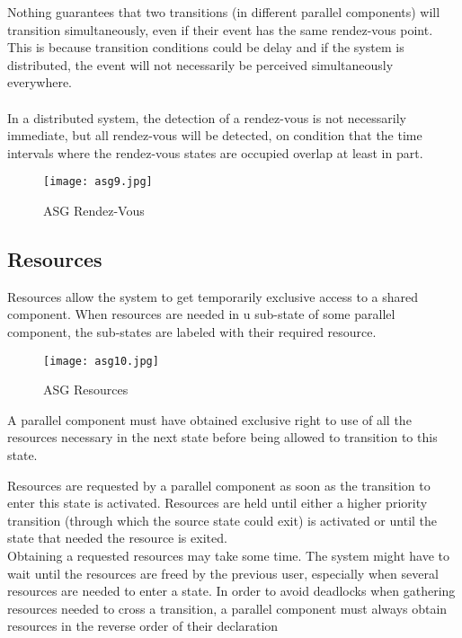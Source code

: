 \documentclass[../main.tex]{subfiles}
\begin{document}
Nothing guarantees that two transitions (in different parallel components) will transition simultaneously, even if their event has the same rendez-vous point. This is because transition conditions could be delay and if the system is distributed, the event will not necessarily be perceived simultaneously everywhere.
\\\\
In a distributed system, the detection of a rendez-vous is not necessarily immediate, but all rendez-vous will be detected, on condition that the time intervals where the rendez-vous states are occupied overlap at least in part. 
\begin{figure}[H]
    \centering
    \texttt{[image: asg9.jpg]}
    \caption{ASG Rendez-Vous}
    \label{asg9}
\end{figure}

\subsection{Resources}
Resources allow the system to get temporarily exclusive access to a shared component. When resources are needed in u sub-state of some parallel component, the sub-states are labeled with their required resource.  


\begin{figure}[H]
    \centering
    \texttt{[image: asg10.jpg]}
    \caption{ASG Resources}
    \label{asg10}
\end{figure}
A parallel component must have obtained exclusive right to use of all the resources necessary in the next state before being allowed to transition to this state.

Resources are requested by a parallel component as soon as the transition to enter this state is activated. Resources are held until either a higher priority transition (through which the source state could exit) is activated or until the state that needed the resource is exited.
\\
Obtaining a requested resources may take some time. The system might have to wait until the resources are freed by the previous user, especially when several resources are needed to enter a state. 
In order to avoid deadlocks when gathering resources needed to cross a transition, a parallel component must always obtain resources in the reverse order of their declaration
\end{document}
